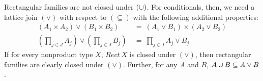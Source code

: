 \documentclass{llncs}
\newcommand{\join}{\vee}
\begin{document}
Rectangular families are not closed under $(\cup)$.
For conditionals, then, we need a lattice join $(\join)$ with respect to $(\subseteq)$ with the following additional properties:
\begin{equation}
\begin{aligned}
	(A_1 \times A_2) \join (B_1 \times B_2) &\ = \ (A_1 \join B_1) \times (A_2 \join B_2) \\
	(\textstyle\prod_{j \in J} A_j) \join (\textstyle\prod_{j \in J} B_j) &\ = \ \textstyle\prod_{j \in J} A_j \join B_j
\label{eqn:join-laws}
\end{aligned}
\end{equation}
If for every nonproduct type $X$, $Rect~X$ is closed under $(\join)$, then rectangular families are clearly closed under $(\join)$. Further, for any $A$ and $B$, $A \u B \subseteq A \join B$.
\end{document}
